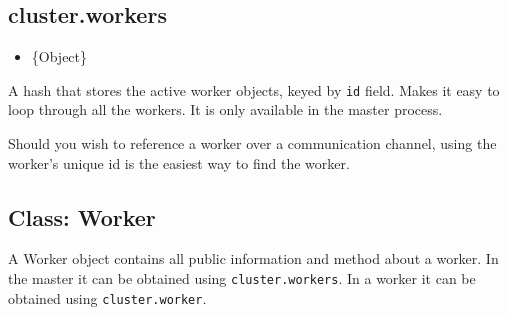 \subsection{cluster.workers}

\begin{itemize}
\item
  \{Object\}
\end{itemize}

A hash that stores the active worker objects, keyed by \texttt{id}
field. Makes it easy to loop through all the workers. It is only
available in the master process.

\begin{Shaded}
\begin{Highlighting}[]
 
   \NormalTok{(}  \NormalTok{) \{}
    \NormalTok{[id]);}
  \NormalTok{\}}
\NormalTok{\}}
  \NormalTok{(}\NormalTok{);}
\NormalTok{\});}
\end{Highlighting}
\end{Shaded}

Should you wish to reference a worker over a communication channel,
using the worker's unique id is the easiest way to find the worker.

\begin{Shaded}
\begin{Highlighting}[]
\NormalTok{(}\NormalTok{, }
   \NormalTok{[id];}
\NormalTok{\});}
\end{Highlighting}
\end{Shaded}

\subsection{Class: Worker}

A Worker object contains all public information and method about a
worker. In the master it can be obtained using \texttt{cluster.workers}.
In a worker it can be obtained using \texttt{cluster.worker}.

